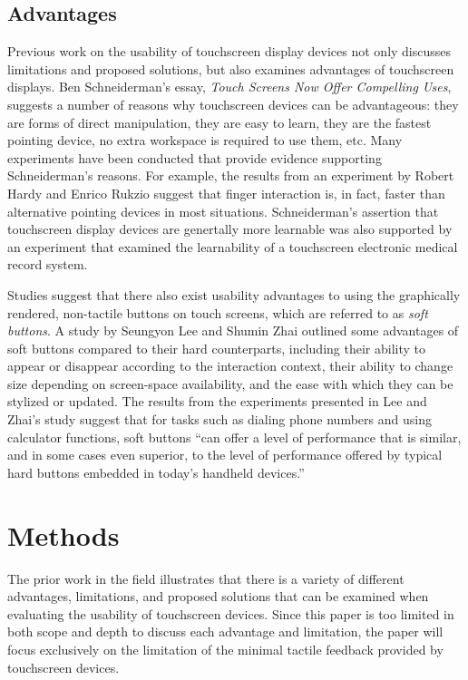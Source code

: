 \documentclass[11pt]{article}
\begin{document}
\subsection{Advantages}
Previous work on the usability of touchscreen display devices not only discusses limitations and proposed solutions, but also examines advantages of touchscreen displays. Ben Schneiderman's essay, \textit{Touch Screens Now Offer Compelling Uses}, suggests a number of reasons why touchscreen devices can be advantageous: they are forms of direct manipulation, they are easy to learn, they are the fastest pointing device, no extra workspace is required to use them, etc. \cite{73754} Many experiments have been conducted that provide evidence supporting Schneiderman's reasons. For example, the results from an experiment by Robert Hardy and Enrico Rukzio suggest that finger interaction is, in fact, faster than alternative pointing devices in most situations.\cite{Hardy:2008:TIT:1409240.1409267} Schneiderman's assertion that touchscreen display devices are genertally more learnable was also supported by an experiment that examined the learnability of a touchscreen electronic medical record system.\cite{Douglas:2011:SUL:2029976.2029990}

Studies suggest that there also exist usability advantages to using the graphically rendered, non-tactile buttons on touch screens, which are referred to as \textit{soft buttons}. A study by Seungyon Lee and Shumin Zhai outlined some advantages of soft buttons compared to their hard counterparts, including their ability to appear or disappear according to the interaction context, their ability to change size depending on screen-space availability, and the ease with which they can be stylized or updated.\cite{Lee:2009:PTS:1518701.1518750} The results from the experiments presented in Lee and Zhai's study suggest that for tasks such as  dialing phone numbers and using calculator functions, soft buttons ``can offer a level of performance that is similar, and in some cases even superior, to the level of performance offered by typical hard buttons embedded in today's handheld devices.'' \cite{Lee:2009:PTS:1518701.1518750}


\section{Methods}
The prior work in the field illustrates that there is a variety of different advantages, limitations, and proposed solutions that can be examined when evaluating the usability of touchscreen devices. Since this paper is too limited in both scope and depth to discuss each advantage and limitation, the paper will focus exclusively on the limitation of the minimal tactile feedback provided by touchscreen devices. 
\end{document}
